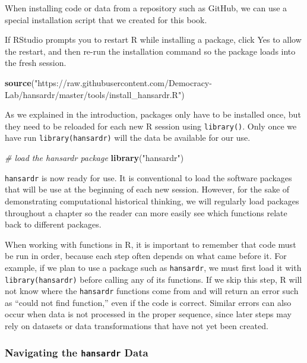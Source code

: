 \documentclass[
]{article}
\newenvironment{Shaded}{\begin{snugshade}}{\end{snugshade}}
\newcommand{\CommentTok}[1]{\textcolor[rgb]{0.56,0.35,0.01}{\textit{#1}}}
\newcommand{\FunctionTok}[1]{\textcolor[rgb]{0.13,0.29,0.53}{\textbf{#1}}}
\newcommand{\NormalTok}[1]{#1}
\newcommand{\StringTok}[1]{\textcolor[rgb]{0.31,0.60,0.02}{#1}}
\begin{document}
When installing code or data from a repository such as GitHub, we can
use a special installation script that we created for this book.

If RStudio prompts you to restart R while installing a package, click
Yes to allow the restart, and then re-run the installation command so
the package loads into the fresh session.

\begin{Shaded}
\begin{Highlighting}[]
\FunctionTok{source}\NormalTok{(}\StringTok{"https://raw.githubusercontent.com/Democracy{-}Lab/hansardr/master/tools/install\_hansardr.R"}\NormalTok{)}
\end{Highlighting}
\end{Shaded}

As we explained in the introduction, packages only have to be installed
once, but they need to be reloaded for each new R session using
\texttt{library()}. Only once we have run \texttt{library(hansardr)}
will the data be available for our use.

\begin{Shaded}
\begin{Highlighting}[]
\CommentTok{\# load the hansardr package}
\FunctionTok{library}\NormalTok{(}\StringTok{"hansardr"}\NormalTok{)}
\end{Highlighting}
\end{Shaded}

\texttt{hansardr} is now ready for use. It is conventional to load the
software packages that will be use at the beginning of each new session.
However, for the sake of demonstrating computational historical
thinking, we will regularly load packages throughout a chapter so the
reader can more easily see which functions relate back to different
packages.

When working with functions in R, it is important to remember that code
must be run in order, because each step often depends on what came
before it. For example, if we plan to use a package such as
\texttt{hansardr}, we must first load it with \texttt{library(hansardr)}
before calling any of its functions. If we skip this step, R will not
know where the \texttt{hansardr} functions come from and will return an
error such as ``could not find function,'' even if the code is correct.
Similar errors can also occur when data is not processed in the proper
sequence, since later steps may rely on datasets or data transformations
that have not yet been created.

\subsubsection{\texorpdfstring{Navigating the \texttt{hansardr}
Data}{Navigating the hansardr Data}}\label{navigating-the-hansardr-data}
\end{document}
